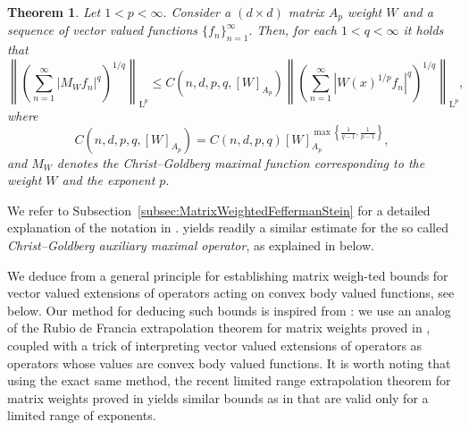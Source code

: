 \documentclass{article}
\newtheorem{theorem}{Theorem}
\theoremstyle{definition}
\theoremstyle{remark}
\numberwithin{equation}{section}
\newcommand{\norm}[2]{\left\|{#1}\right\|_{{#2}}}
\newcommand{\Lp}[1]{\mathrm{L}^{#1}}
\newcommand{\1}{\mathbf{1}}
\begin{document}
    \begin{theorem}
        \label{thm:FeffermanSteinPointwiseWeightedMaximal}
        Let $1<p<\infty.$ Consider a $(d \times d)$ matrix $A_p$ weight $W$ and a sequence of vector valued functions $\{f_n\}^{\infty}_{n=1}.$
        Then, for each $1 < q < \infty$ it holds that
        \begin{equation*}
            \norm{\left(\sum_{n=1}^\infty |M_W f_n|^q\right)^{1/q}}{\Lp{p}}
            \leq C(n,d,p,q,[W]_{A_p}) \norm{\left(\sum_{n=1}^\infty |W(x)^{1/p} f_n|^q\right)^{1/q}}{\Lp{p}},
        \end{equation*}
        where
        \begin{equation*}
            C(n,d,p,q,[W]_{A_p}) = C(n,d,p,q) [W]_{A_p}^{\max\left\{\frac{1}{q-1},\frac{1}{p-1}\right\}},
        \end{equation*}
        and $M_{W}$ denotes the Christ--Goldberg maximal function corresponding to the weight $W$ and the exponent $p.$
    \end{theorem}

    We refer to Subsection~\ref{subsec:MatrixWeightedFeffermanStein} for a detailed explanation of the notation in .  yields readily a similar estimate for the so called \emph{Christ--Goldberg auxiliary maximal operator}, as explained in  below.
    
    We deduce  from a general principle for establishing matrix weigh-ted bounds for vector valued extensions of operators acting on convex body valued functions, see  below. Our method for deducing such bounds is inspired from \cite{Book_Extrapolation}: we use an analog of the Rubio de Francia extrapolation theorem for matrix weights proved in \cite{Cruz_Uribe_Bownik_Extrapolation}, coupled with a trick of interpreting vector valued extensions of operators as operators whose values are convex body valued functions. It is worth noting that using the exact same method, the recent limited range extrapolation theorem for matrix weights proved in \cite{Kakaroumpas_Nguyen_Vardakis_2024} yields similar bounds as in  that are valid only for a limited range of exponents.
    
\end{document}
